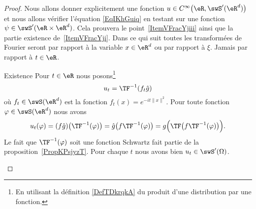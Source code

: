 \begin{proof}
    Nous allons donner explicitement une fonction \( u\in C^{\infty}\big( \eR,\swS'(\eR^d) \big)\) et nous allons vérifier l'équation \eqref{EqIKhGuiq} en testant sur une fonction \( \psi\in\swS'(\eR\times \eR^d)\). Cela prouvera le point~\ref{ItemVFracYjiii} ainsi que la partie existence de~\ref{ItemVFracYji}. Dans ce qui suit toutes les transformées de Fourier seront par rapport à la variable \( x\in \eR^d\) ou par rapport à \( \xi\). Jamais par rapport à \( t\in \eR\).

    \begin{subproof}
    \item[Existence]
        Pour \( t\in \eR\) nous posons\footnote{En utilisant la définition \eqref{DefTDkrqkA} du produit d'une distribution par une fonction.}
        \begin{equation}
            u_t=\TF^{-1}(f_t\hat g)
        \end{equation}
        où \( f_t\in\swS(\eR^d)\) est la fonction \( f_t(x)= e^{-it\| x \|^2}\). Pour toute fonction \( \varphi\in\swS(\eR^d)\) nous avons
        \begin{equation}
            u_t(\varphi)=(f\hat g)\big( \TF^{-1}(\varphi) \big)=\hat g\big( f\TF^{-1}(\varphi) \big)=g\Big( \TF\big( f\TF^{-1}(\varphi) \big) \Big).
        \end{equation}
        Le fait que \( \TF^{-1}(\varphi)\) soit une fonction Schwartz fait partie de la proposition~\ref{PropKPsjyzT}. Pour chaque \( t\) nous avons bien \( u_t\in\swS'(\Omega)\).


\end{subproof}
\end{proof}
